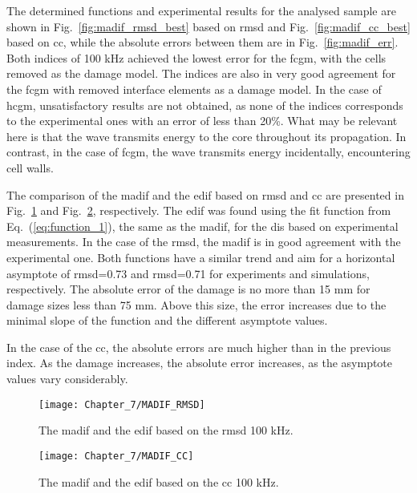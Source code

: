 The determined functions and experimental results for the analysed sample are shown in Fig.~\ref{fig:madif_rmsd_best} based on \ac{rmsd} and Fig.~\ref{fig:madif_cc_best} based on \ac{cc}, while the absolute errors between them are in Fig.~\ref{fig:madif_err}.
Both indices of 100 \unit{\kHz} achieved the lowest error for the \ac{fcgm}, with the cells removed as the damage model.
The indices are also in very good agreement for the \ac{fcgm} with removed interface elements as a damage model.
In the case of \ac{hcgm}, unsatisfactory results are not obtained, as none of the indices corresponds to the experimental ones with an error of less than 20\%.
What may be relevant here is that the wave transmits energy to the core throughout its propagation.
In contrast, in the case of \ac{fcgm}, the wave transmits energy incidentally, encountering cell walls.

The comparison of the \ac{madif} and the \ac{edif} based on \ac{rmsd} and \ac{cc} are presented in Fig.~\ref{fig:madif_rmsd} and Fig.~\ref{fig:madif_cc}, respectively.
The \ac{edif} was found using the fit function from Eq.~(\ref{eq:function_1}), the same as the \ac{madif}, for the \acp{di} based on experimental measurements.
In the case of the \ac{rmsd}, the \ac{madif} is in good agreement with the experimental one.
Both functions have a similar trend and aim for a horizontal asymptote of \ac{rmsd}=0.73 and \ac{rmsd}=0.71 for experiments and simulations, respectively.
The absolute error of the damage is no more than 15 \unit{\mm} for damage sizes less than 75 \unit{\mm}.
Above this size, the error increases due to the minimal slope of the function and the different asymptote values.

In the case of the \ac{cc}, the absolute errors are much higher than in the previous index.
As the damage increases, the absolute error increases, as the asymptote values vary considerably.
\begin{figure}[!tbh]
	\begin{center}
		\texttt{[image: Chapter\_7/MADIF\_RMSD]}
	\end{center}
	\caption{The \acf{madif} and the \acf{edif} based on the \acf{rmsd} 100 \unit{\kHz}.}
	\label{fig:madif_rmsd}
\end{figure}
\begin{figure}[!tbh]
	\begin{center}
		\texttt{[image: Chapter\_7/MADIF\_CC]}
	\end{center}
	\caption{The \acf{madif} and the \acf{edif} based on the \acf{cc} 100 \unit{\kHz}.}
	\label{fig:madif_cc}
\end{figure}